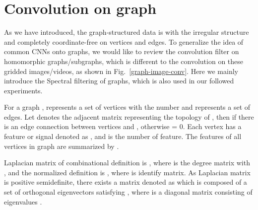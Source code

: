 \documentclass[journal]{IEEEtran}
\begin{document}
\begin{figure*}[ht]
	\centering
	\vspace{-1em}
	\caption{Different convolution operations on graph (left) and gridded image (right) samples.
	(a) shows the 1-localized convolution on graph data, where the red node has 6 adjacencies, and the green node has 3 adjacencies. In the process of convolution, they use the features of the 6 and 3 nodes respectively, in addition to the feature of their own nodes. 	
	(b) shows the convolution operation on the regular gridded data (e.g., images and videos). As long as a fixed-size convolution kernel is given, the convolution kernel will slid from left-to-right and top-to-bottom, all vertices can be then convolved once.}
	\label{graph-image-conv}
	\vspace{-1em}
\end{figure*}

\section{Convolution on graph}
\label{sec:Convolution on graph}

As we have introduced, the graph-structured data is with the irregular structure and completely coordinate-free on vertices and edges.
To generalize the idea of common CNNs onto graphs, we would like to review the convolution filter on homomorphic graphs/subgraphs, which is different to the convolution on these gridded images/videos, as shown in Fig.~\ref{graph-image-conv}.
Here we mainly introduce the Spectral filtering of graphs, which is also used in our followed experiments.

For a graph ,  represents a set of vertices with the number  and  represents a set of edges.  Let  denotes the adjacent matrix representing the topology of , then  if  there is an edge connection between vertices  and ,  otherwise  = 0. Each vertex has a feature or signal denoted as  , and  is the number of feature. The features of all vertices in graph are summarized by .



Laplacian matrix of combinational definition is , where  is the degree matrix with , and the normalized definition is , where  is identify matrix. As Laplacian matrix is positive semidefinite, there exists a matrix denoted as  which is composed of a set of orthogonal eigenvectors  satisfying  , where  is a diagonal matrix consisting of eigenvalues  .
\end{document}
